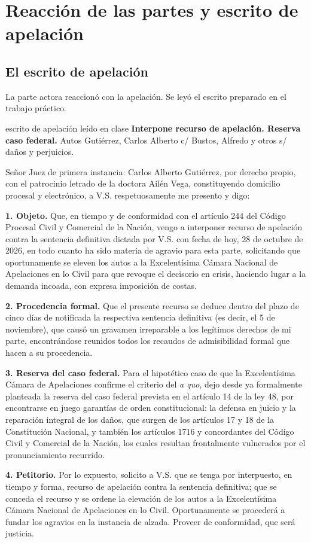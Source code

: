 \documentclass[12pt,oneside]{book}
\begin{document}
\section{Reacci\'on de las partes y escrito de apelaci\'on}

\subsection{El escrito de apelaci\'on}

La parte actora reaccion\'o con la apelaci\'on. Se ley\'o el escrito preparado en el trabajo pr\'actico.

\begin{example}{escrito de apelaci\'on le\'ido en clase}
\textbf{Interpone recurso de apelaci\'on. Reserva caso federal.} Autos \guillemotleft Guti\'errez, Carlos Alberto c/ Bustos, Alfredo y otros s/ da\~nos y perjuicios\guillemotright.

Se\~nor Juez de primera instancia: Carlos Alberto Guti\'errez, por derecho propio, con el patrocinio letrado de la doctora Ail\'en Vega, constituyendo domicilio procesal y electr\'onico, a V.S. respetuosamente me presento y digo:

\textbf{1. Objeto.} Que, en tiempo y de conformidad con el art\'iculo 244 del C\'odigo Procesal Civil y Comercial de la Naci\'on, vengo a interponer recurso de apelaci\'on contra la sentencia definitiva dictada por V.S. con fecha de hoy, 28 de octubre de 2026, en todo cuanto ha sido materia de agravio para esta parte, solicitando que oportunamente se eleven los autos a la Excelent\'isima C\'amara Nacional de Apelaciones en lo Civil para que revoque el decisorio en crisis, haciendo lugar a la demanda incoada, con expresa imposici\'on de costas.

\textbf{2. Procedencia formal.} Que el presente recurso se deduce dentro del plazo de cinco d\'ias de notificada la respectiva sentencia definitiva (es decir, el 5 de noviembre), que caus\'o un gravamen irreparable a los leg\'itimos derechos de mi parte, encontr\'andose reunidos todos los recaudos de admisibilidad formal que hacen a su procedencia.

\textbf{3. Reserva del caso federal.} Para el hipot\'etico caso de que la Excelent\'isima C\'amara de Apelaciones confirme el criterio del \emph{a quo}, dejo desde ya formalmente planteada la reserva del caso federal prevista en el art\'iculo 14 de la ley 48, por encontrarse en juego garant\'ias de orden constitucional: la defensa en juicio y la reparaci\'on integral de los da\~nos, que surgen de los art\'iculos 17 y 18 de la Constituci\'on Nacional, y tambi\'en los art\'iculos 1716 y concordantes del C\'odigo Civil y Comercial de la Naci\'on, los cuales resultan frontalmente vulnerados por el pronunciamiento recurrido.

\textbf{4. Petitorio.} Por lo expuesto, solicito a V.S. que se tenga por interpuesto, en tiempo y forma, recurso de apelaci\'on contra la sentencia definitiva; que se conceda el recurso y se ordene la elevaci\'on de los autos a la Excelent\'isima C\'amara Nacional de Apelaciones en lo Civil. Oportunamente se proceder\'a a fundar los agravios en la instancia de alzada. Proveer de conformidad, que ser\'a justicia.
\end{example}
\end{document}
